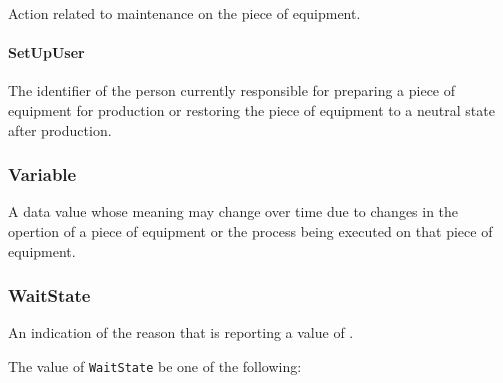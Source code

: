 Action related to maintenance on the piece of equipment.


\paragraph{SetUpUser}\mbox{}
\label{sec:SetUpUser}



The identifier of the person currently responsible for preparing a piece of equipment for production or restoring the piece of equipment to a neutral state after production.


\subsubsection{Variable}
\label{sec:Variable}



A data value whose meaning may change over time due to changes in the opertion of a piece of equipment or the process being executed on that piece of equipment.

\FloatBarrier

\subsubsection{WaitState}
\label{sec:WaitState}



An indication of the reason that  is reporting a value of .


The value of \texttt{WaitState} \MUST be one of the following: 


